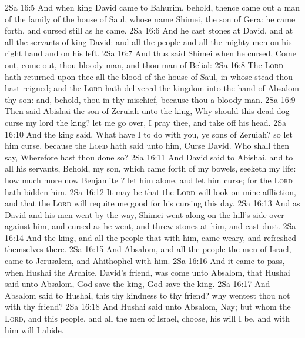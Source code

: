 \vs 2Sa 16:5 And when king David came to Bahurim, behold, thence came out a man of the family of the house of Saul, whose name  Shimei, the son of Gera: he came forth, and cursed still as he came.
\vs 2Sa 16:6 And he cast stones at David, and at all the servants of king David: and all the people and all the mighty men  on his right hand and on his left.
\vs 2Sa 16:7 And thus said Shimei when he cursed, Come out, come out, thou bloody man, and thou man of Belial:
\vs 2Sa 16:8 The \textsc{Lord} hath returned upon thee all the blood of the house of Saul, in whose stead thou hast reigned; and the \textsc{Lord} hath delivered the kingdom into the hand of Absalom thy son: and, behold, thou  in thy mischief, because thou  a bloody man.
\vs 2Sa 16:9 Then said Abishai the son of Zeruiah unto the king, Why should this dead dog curse my lord the king? let me go over, I pray thee, and take off his head.
\vs 2Sa 16:10 And the king said, What have I to do with you, ye sons of Zeruiah? so let him curse, because the \textsc{Lord} hath said unto him, Curse David. Who shall then say, Wherefore hast thou done so?
\vs 2Sa 16:11 And David said to Abishai, and to all his servants, Behold, my son, which came forth of my bowels, seeketh my life: how much more now  Benjamite ? let him alone, and let him curse; for the \textsc{Lord} hath bidden him.
\vs 2Sa 16:12 It may be that the \textsc{Lord} will look on mine affliction, and that the \textsc{Lord} will requite me good for his cursing this day.
\vs 2Sa 16:13 And as David and his men went by the way, Shimei went along on the hill's side over against him, and cursed as he went, and threw stones at him, and cast dust.
\vs 2Sa 16:14 And the king, and all the people that  with him, came weary, and refreshed themselves there.
\vs 2Sa 16:15 And Absalom, and all the people the men of Israel, came to Jerusalem, and Ahithophel with him.
\vs 2Sa 16:16 And it came to pass, when Hushai the Archite, David's friend, was come unto Absalom, that Hushai said unto Absalom, God save the king, God save the king.
\vs 2Sa 16:17 And Absalom said to Hushai,  this thy kindness to thy friend? why wentest thou not with thy friend?
\vs 2Sa 16:18 And Hushai said unto Absalom, Nay; but whom the \textsc{Lord}, and this people, and all the men of Israel, choose, his will I be, and with him will I abide.
